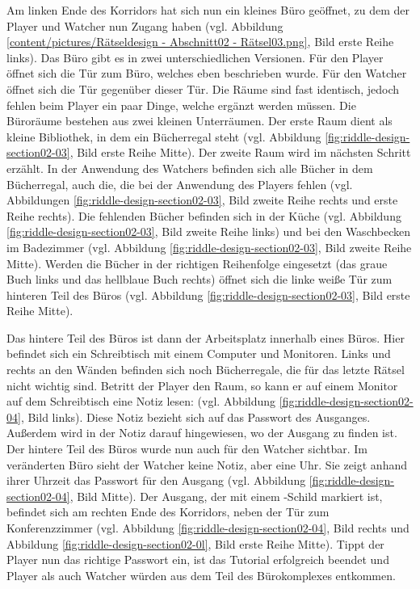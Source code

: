 Am linken Ende des Korridors hat sich nun ein kleines Büro geöffnet, zu dem der Player und Watcher nun Zugang haben (vgl. Abbildung \ref{content/pictures/Rätseldesign - Abschnitt02 - Rätsel03.png}, Bild erste Reihe links). Das Büro gibt es in zwei unterschiedlichen Versionen. Für den Player öffnet sich die Tür zum Büro, welches eben beschrieben wurde. Für den Watcher öffnet sich die Tür gegenüber dieser Tür. Die Räume sind fast identisch, jedoch fehlen beim Player ein paar Dinge, welche ergänzt werden müssen. Die Büroräume bestehen aus zwei kleinen Unterräumen. Der erste Raum dient als kleine Bibliothek, in dem ein Bücherregal steht (vgl. Abbildung \ref{fig:riddle-design-section02-03}, Bild erste Reihe Mitte). Der zweite Raum wird im nächsten Schritt erzählt. In der Anwendung des Watchers befinden sich alle Bücher in dem Bücherregal, auch die, die bei der Anwendung des Players fehlen (vgl. Abbildungen \ref{fig:riddle-design-section02-03}, Bild zweite Reihe rechts und erste Reihe rechts). Die fehlenden Bücher befinden sich in der Küche (vgl. Abbildung \ref{fig:riddle-design-section02-03}, Bild zweite Reihe links) und bei den Waschbecken im Badezimmer (vgl. Abbildung \ref{fig:riddle-design-section02-03}, Bild zweite Reihe Mitte). Werden die Bücher in der richtigen Reihenfolge eingesetzt (das graue Buch links und das hellblaue Buch rechts) öffnet sich die linke weiße Tür zum hinteren Teil des Büros (vgl. Abbildung \ref{fig:riddle-design-section02-03}, Bild erste Reihe Mitte).

Das hintere Teil des Büros ist dann der Arbeitsplatz innerhalb eines Büros. Hier befindet sich ein Schreibtisch mit einem Computer und Monitoren. Links und rechts an den Wänden befinden sich noch Bücherregale, die für das letzte Rätsel nicht wichtig sind. Betritt der Player den Raum, so kann er auf einem Monitor auf dem Schreibtisch eine Notiz lesen:  (vgl. Abbildung \ref{fig:riddle-design-section02-04}, Bild links). Diese Notiz bezieht sich auf das Passwort des Ausganges. Außerdem wird in der Notiz darauf hingewiesen, wo der Ausgang zu finden ist.
Der hintere Teil des Büros wurde nun auch für den Watcher sichtbar. Im veränderten Büro sieht der Watcher keine Notiz, aber eine Uhr. Sie zeigt anhand ihrer Uhrzeit das Passwort für den Ausgang (vgl. Abbildung \ref{fig:riddle-design-section02-04}, Bild Mitte). Der Ausgang, der mit einem -Schild markiert ist, befindet sich am rechten Ende des Korridors, neben der Tür zum Konferenzzimmer (vgl. Abbildung \ref{fig:riddle-design-section02-04}, Bild rechts und Abbildung \ref{fig:riddle-design-section02-0l}, Bild erste Reihe Mitte). Tippt der Player nun das richtige Passwort ein, ist das Tutorial erfolgreich beendet und Player als auch Watcher würden aus dem Teil des Bürokomplexes entkommen.

